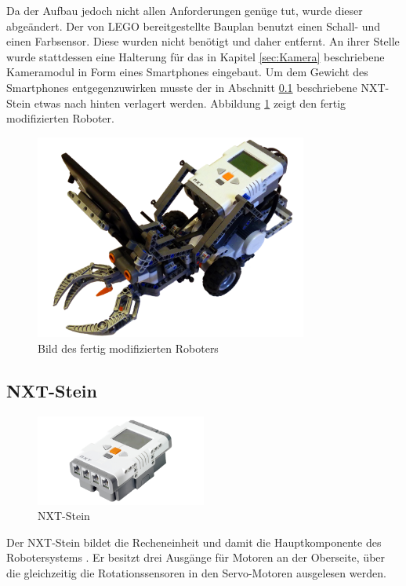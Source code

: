 Da der Aufbau jedoch nicht allen Anforderungen genüge tut, wurde dieser abgeändert. Der von LEGO bereitgestellte Bauplan benutzt einen Schall- und einen Farbsensor. Diese wurden nicht benötigt und daher entfernt. An ihrer Stelle wurde stattdessen eine Halterung für das in Kapitel \ref{sec:Kamera} beschriebene Kameramodul in Form eines Smartphones eingebaut. Um dem Gewicht des Smartphones entgegenzuwirken musste der in Abschnitt \ref{subsec:Brick} beschriebene NXT-Stein etwas nach hinten verlagert werden. Abbildung \ref{fig:unserRoboter} zeigt den fertig modifizierten Roboter.

\begin{figure}[h]
\centering
\includegraphics[width=0.8\textwidth]{Bilder/Robot/cleenr_front}
\caption{Bild des fertig modifizierten Roboters}
\label{fig:unserRoboter}
\end{figure}

\subsection{NXT-Stein}
\label{subsec:Brick}
\begin{figure}[h]
\centering
\includegraphics[width=0.5\textwidth]{Bilder/Robot/nxt_brick}
\caption{NXT-Stein}
\label{fig:nxtBrick}
\end{figure}

Der NXT-Stein bildet die Recheneinheit und damit die Hauptkomponente des Robotersystems \cite{ranganathan2008use}. Er besitzt drei Ausgänge für Motoren an der Oberseite, über die gleichzeitig die Rotationssensoren in den Servo-Motoren ausgelesen werden.


